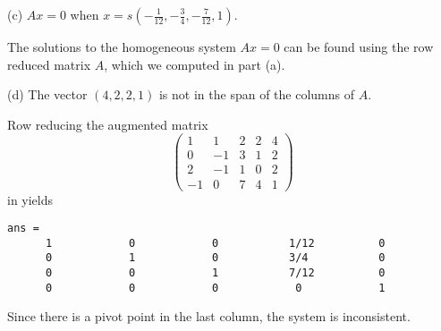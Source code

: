 \documentclass{ximera}
\begin{document}
\begin{exercise}
\begin{solution}
(c) \ans $Ax = 0$ when $x = s(-\frac{1}{12},-\frac{3}{4}, -\frac{7}{12},1)$.

\soln The solutions to the homogeneous system $Ax = 0$ can be found
using the row reduced matrix $A$, which we computed in part (a).

(d) \ans The vector $(4,2,2,1)$ is not in the span of the columns of
$A$.

\soln Row reducing the augmented matrix
\[
\left(\begin{array}{rrrr|r} 1 & 1 & 2 & 2 & 4 \\ 0 & -1 & 3 &
1 & 2 \\ 2 & -1 & 1 & 0 & 2 \\ -1 & 0 & 7 & 4 & 1 \end{array}\right)
\]
in \Matlab yields
\begin{verbatim}
ans =
      1            0            0           1/12          0      
      0            1            0           3/4           0      
      0            0            1           7/12          0      
      0            0            0            0            1      
\end{verbatim}
Since there is a pivot point in the last column, the system is
inconsistent.




\end{solution}
\end{exercise}

\AEXER
\end{document}
